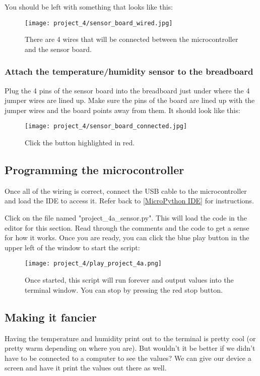 You should be left with something that looks like this:
\begin{figure}[H]
    \centering
    \texttt{[image: project\_4/sensor\_board\_wired.jpg]}
    \caption{There are 4 wires that will be connected between the microcontroller and the sensor board.}
\end{figure}

\subsubsection{Attach the temperature/humidity sensor to the breadboard}
Plug the 4 pins of the sensor board into the breadboard just under where the 4 jumper wires are lined up. Make sure the pins
of the board are lined up with the jumper wires and the board points away from them. It should look like this:

\begin{figure}[H]
    \centering
    \texttt{[image: project\_4/sensor\_board\_connected.jpg]}
    \caption{Click the button highlighted in red.}
\end{figure}

\subsection{Programming the microcontroller}
Once all of the wiring is correct, connect the USB cable to the microcontroller and load the IDE to
access it. Refer back to \ref{MicroPython IDE} for instructions.

Click on the file named "project\_4a\_sensor.py". This will load the code in the editor for this section. Read through the comments
and the code to get a sense for how it works. Once you are ready, you can click the blue play button in the upper left of the window to start the script:
\begin{figure}[H]
    \centering
    \texttt{[image: project\_4/play\_project\_4a.png]}
    \caption{Once started, this script will run forever and output values into the terminal window. You can stop by pressing the red stop button.}
\end{figure}

\subsection{Making it fancier}
Having the temperature and humidity print out to the terminal is pretty cool (or pretty warm depending on where you are).
But wouldn't it be better if we didn't have to be connected to a computer to see the values? We can give our device a screen and have it print the values out there as well.

